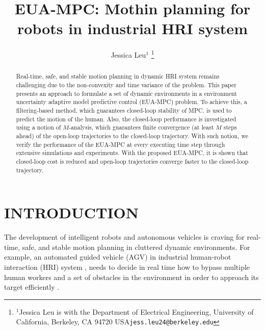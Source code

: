 \documentclass[letterpaper, 10 pt, conference]{ieeeconf}  %
\title{\LARGE \bf
EUA-MPC: Mothin planning for robots in industrial HRI system  
}
\author{ Jessica Leu$^{1}$%
\thanks{$^{1}$Jessica Leu is with the Department of Electrical Engineering, University of California,
Berkeley, CA 94720 USA{\tt\small jess.leu24@berkeley.edu}}%
}
\begin{document}
\maketitle
\thispagestyle{empty}
\pagestyle{empty}


\begin{abstract}

Real-time, safe, and stable motion planning in dynamic HRI system remains challenging due to the non-convexity and time variance of the problem. This paper presents an approach to formulate a set of dynamic environments in a environment uncertainty adaptive model predictive control (EUA-MPC) problem. To achieve this, a filtering-based method, which guarantees closed-loop stability of MPC, is used to predict the motion of the human. Also, the closed-loop performance is investigated using a notion of $M$-analysis, which guarantees finite convergence (at least $M$ steps ahead) of the open-loop trajectories to the closed-loop trajectory. With such notion, we verify the performance of the EUA-MPC at every executing time step through extensive simulations and experiments. With the proposed EUA-MPC, it is shown that closed-loop cost is reduced and open-loop trajectories converge faster to the closed-loop trajectory.
\end{abstract}


\section{INTRODUCTION}

The development of intelligent robots and autonomous vehicles is craving for real-time, safe, and stable motion planning in cluttered dynamic environments. For example, an automated guided vehicle (AGV) in industrial human-robot interaction (HRI) system \cite{wu2004modeling}, needs to decide in real time how to bypass multiple human workers and a set of obstacles in the environment in order to approach its target efficiently \cite{wang2009autonomous,oleari2014industrial}. 
\end{document}
